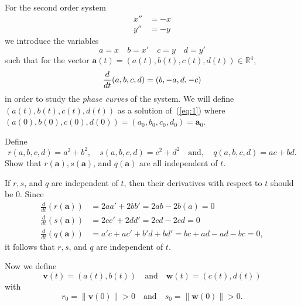 \documentclass{exam}
\newcommand{\RR}{\mathbb R}
\begin{document}
For the second order system 
\begin{align*}
    x'' &= -x \\
    y'' &= -y
\end{align*}
we introduce the variables 
\[
    a = x \quad b = x' \quad c = y \quad d = y'
\]
such that for the vector $\mathbf{a}(t) = (a(t), b(t), c(t), d(t)) \in \RR^{4}$,
\begin{equation}{\label{eq:1}}
    \frac{d}{dt}(a, b, c, d) = (b, -a, d, -c)
\end{equation}
in order to study the \textit{phase curves} of the system. We will define $(a(t), b(t), c(t), d(t))$ as a solution of~(\ref{eq:1}) where $(a(0), b(0), c(0), d(0)) = (a_0, b_0, c_0, d_0) = \mathbf{a}_0$.
\begin{questions}
    \question Define 
    \[
        r(a, b, c, d) = a^2 + b^2, \quad s(a, b, c, d) = c^2 + d^2 \quad \text{and},\quad q(a, b, c, d) = ac + bd.
    \]
    Show that $r(\mathbf{a}), s(\mathbf{a})$, and $q(\mathbf{a})$ are all independent of $t$. 
    \begin{solution}
        If $r, s$, and $q$ are independent of $t$, then their derivatives with respect to $t$ should be $0$. Since
        \begin{align*}
            \frac{d}{dt}(r(\mathbf{a})) &= 2aa' + 2bb' = 2ab - 2b(a) = 0 \\
            \frac{d}{dt}(s(\mathbf{a})) &= 2cc' + 2dd' = 2cd - 2cd = 0 \\
            \frac{d}{dt}(q(\mathbf{a})) &= a'c + ac' + b'd + bd' = bc + ad - ad - bc = 0,
        \end{align*}
        it follows that $r, s$, and $q$ are independent of $t$.
    \end{solution}

Now we define 
\[
    \mathbf{v}(t) = (a(t), b(t)) \quad \text{and} \quad \mathbf{w}(t) = (c(t), d(t))
\]
with 
\[
    r_0 = \|\mathbf{v}(0)\| > 0 \quad \text{and} \quad s_0 = \|\mathbf{w}(0)\| > 0.
\]


\end{questions}
\end{document}
